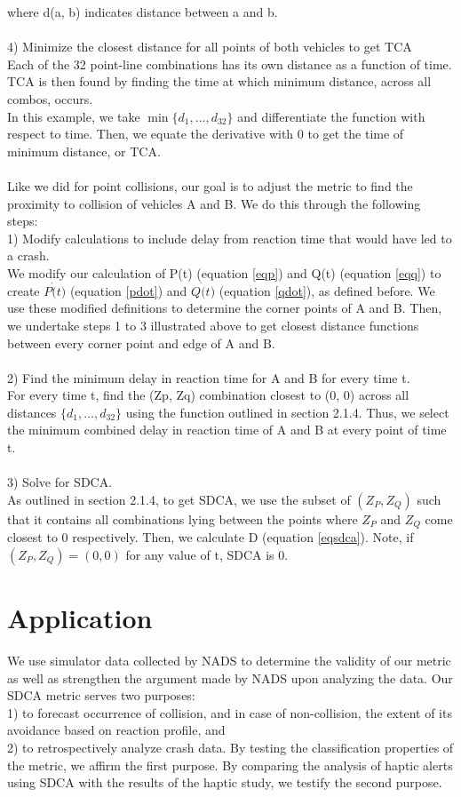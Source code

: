 \documentclass{article}
\begin{document}
where d(a, b) indicates distance between a and b.\\ \\
4) Minimize the closest distance for all points of both vehicles to get TCA\\
Each of the 32 point-line combinations has its own distance as a function of time. TCA is then found by finding the time at which minimum distance, across all combos, occurs.\\
In this example, we take $\min\{d_1,..., d_{32}\}$ and differentiate the function with respect to time. Then, we equate the derivative with 0 to get the time of minimum distance, or TCA.\\ \\
Like we did for point collisions, our goal is to adjust the metric to find the proximity to collision of vehicles A and B. We do this through the following steps:\\ 
1) Modify calculations to include delay from reaction time that would have led to a crash.\\
We modify our calculation of P(t) (equation \ref{eqp}) and Q(t) (equation \ref{eqq}) to create $P\dot(t)$ (equation \ref{pdot}) and $Q\dot(t)$ (equation \ref{qdot}), as defined before. We use these modified definitions to determine the corner points of A and B. Then, we undertake steps 1 to 3 illustrated above to get closest distance functions between every corner point and edge of A and B.\\\\
2) Find the minimum delay in reaction time for A and B for every time t.\\
For every time t, find the (Zp, Zq) combination closest to (0, 0) across all distances $\{d_1,..., d_{32} \}$ using the function outlined in section 2.1.4. Thus, we select the minimum combined delay in reaction time of A and B at every point of time t.\\ \\
3) Solve for SDCA.\\
As outlined in section 2.1.4, to get SDCA, we use the subset of $(Z_P, Z_Q)$ such that it contains all combinations lying between the points where $Z_P$ and $Z_Q$ come closest to 0 respectively. Then, we calculate D (equation \ref{eqsdca}). Note, if $(Z_P, Z_Q) = (0, 0)$ for any value of t, SDCA is 0.
\section{Application}
We use simulator data collected by NADS to determine the validity of our metric as well as strengthen the argument made by NADS upon analyzing the data. Our SDCA metric serves two purposes:\\
1) to forecast occurrence of collision, and in case of non-collision, the extent of its avoidance based on reaction profile, and\\
2) to retrospectively analyze crash data.
By testing the classification properties of the metric, we affirm the first purpose. By comparing the analysis of haptic alerts using SDCA with the results of the haptic study, we testify the second purpose.
\end{document}
